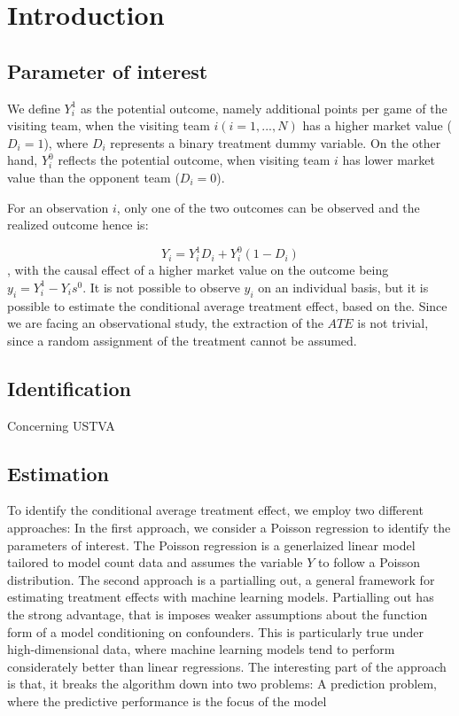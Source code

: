 \section{Introduction}

\subsection{Parameter of interest}
We define $Y^1_i$ as the potential outcome, namely additional points per game of the visiting team, when the visiting
team $i(i = 1, ..., N)$ has a higher market value ($D_i = 1$), where $D_i$ represents a binary treatment dummy variable.
On the other hand, $Y_i^0$ reflects the potential outcome, when visiting team $i$ has lower market value than the
opponent team ($D_i = 0$).

For an observation $i$, only one of the two outcomes can be observed and the realized outcome hence is:

\[ Y_i = Y_i^1D_i + Y_i^0(1-D_i)\], with the causal effect of a higher market value on the outcome being $y_i = Y_i^1 - Y_is^0$.
It is not possible to observe $y_i$ on an individual basis, but it is possible to estimate the conditional
average treatment effect, based on the. Since we are facing an observational study, the extraction of the $ATE$ is not
trivial, since a random assignment of the treatment cannot be assumed.

\subsection{Identification}
Concerning USTVA

\subsection{Estimation}
To identify the conditional average treatment effect, we employ two different approaches:
In the first approach, we consider a Poisson regression to identify the parameters of interest. The Poisson regression
is a generlaized linear model tailored to model count data and assumes the variable $Y$ to follow a Poisson distribution.
The second approach is a partialling out, a general framework for estimating treatment effects with machine learning models.
Partialling out has the strong advantage, that is imposes weaker assumptions about the function form of a model conditioning
on confounders. This is particularly true under high-dimensional data, where machine learning models tend to perform
considerately better than linear regressions. The interesting part of the approach is that, it breaks the algorithm
down into two problems: A prediction problem, where the predictive performance is the focus of the model


